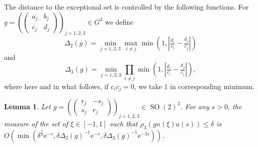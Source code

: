 \documentclass[12pt]{amsart}
\newtheorem{lem}[thm]{Lemma}
\theoremstyle{definition}
\theoremstyle{remark}
\numberwithin{equation}{section}
\newcommand{\e}{\mathrm{e}}
\newcommand{\SO}{\operatorname{SO}}
\begin{document}
The distance to the exceptional set is controlled by the following functions.
For $g =
\left(
\begin{pmatrix}
  a_j & b_j \\
  c_j & d_j
\end{pmatrix}
\right)_{\!\! j=1,2,3} \in G^3$ we define
\begin{equation}
  \label{eq:Delta2def}
  \Delta_2(g) = \min_{j = 1,2,3} \max_{i \neq j} \min ( 1, | \tfrac{d_i}{c_i} - \tfrac{d_j}{c_j}|)
\end{equation}
and
\begin{equation}
  \label{eq:Deltadef}
  \Delta_3(g) = \min_{\!\! j=1,2,3} \prod_{i \neq j} \min(1, |\tfrac{d_i}{c_i} - \tfrac{d_j}{c_j}|),
\end{equation}
where here and in what follows, if $c_ic_j = 0$, we take $1$ in corresponding minimum.


\begin{lem}
  \label{lem:measbound}
  Let $g = \left( \begin{pmatrix}    r_j & -s_j \\
    s_j & r_j
  \end{pmatrix}
  \right)_{\!\! j=1,2,3} \in \SO(2)^3$.
  For any $s > 0$, the measure of the set of $\xi \in [-1,1]$ such that $\rho_3(gn(\xi)a(s)) \leq \delta$ is $O(\min( \delta^{\frac{1}{3}}\e^{-s} , \delta \Delta_2 (g)^{-1} \e^{-s}, \delta \Delta_3(g)^{-1} \e^{-3s}))$. 
\end{lem}
\end{document}
